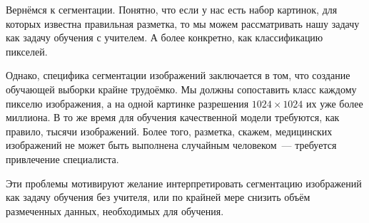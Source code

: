 Вернёмся к сегментации. Понятно, что если у нас есть набор картинок, для которых известна правильная разметка, 
то мы можем рассматривать нашу задачу как задачу обучения с учителем. А более конкретно, как классификацию пикселей.

Однако, специфика сегментации изображений заключается в том, что создание обучающей выборки крайне трудоёмко.
Мы должны сопоставить класс каждому пикселю изображения, а на одной картинке разрешения $1024 \times 1024$ их уже более миллиона.
В то же время для обучения качественной модели требуются, как правило, тысячи изображений.  
Более того, разметка, скажем, медицинских изображений не может быть выполнена случайным человеком~--- требуется привлечение специалиста.

Эти проблемы мотивируют желание интерпретировать сегментацию изображений как задачу обучения без учителя,
или по крайней мере снизить объём размеченных данных, необходимых для обучения.